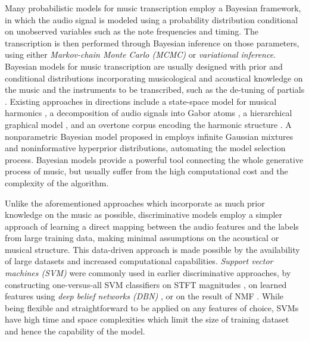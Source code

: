 
Many probabilistic models for music transcription employ a Bayesian framework, in which the audio signal is modeled using a probability distribution conditional on unobserved variables such as the note frequencies and timing.
The transcription is then performed through Bayesian inference on those parameters, using either \textit{Markov-chain Monte Carlo (MCMC)} or \textit{variational inference}.
Bayesian models for music transcription are usually designed with prior and conditional distributions incorporating musicological and acoustical knowledge on the music and the instruments to be transcribed, such as the de-tuning of partials \cite{davy2003harmonic}.
Existing approaches in directions include
a state-space model for musical harmonics \cite{cemgil2003generative},
a decomposition of audio signals into Gabor atoms \cite{davy2006bayesian}, 
a hierarchical graphical model \cite{pesek2017hierarchical},
and an overtone corpus encoding the harmonic structure \cite{sakaue2013overtone}.
A nonparametric Bayesian model proposed in \cite{yoshii2012nonparametric} employs infinite Gaussian mixtures and noninformative hyperprior distributions, automating the model selection process.
Bayesian models provide a powerful tool connecting the whole generative process of music, but usually suffer from the high computational cost and the complexity of the algorithm.



Unlike the aforementioned approaches which incorporate as much prior knowledge on the music as possible, discriminative models employ a simpler approach of learning a direct mapping between the audio features and the labels from large training data, making minimal assumptions on the acoustical or musical structure.
This data-driven approach is made possible by the availability of large datasets and increased computational capabilities.
\textit{Support vector machines (SVM)} were commonly used in earlier discriminative approaches, by constructing one-versus-all SVM classifiers on STFT magnitudes \cite{poliner2006discriminative}, on learned features using \textit{deep belief networks (DBN)} \cite{nam2011classification}, or on the result of NMF \cite{weninger2013nmf}.
While being flexible and straightforward to be applied on any features of choice, SVMs have high time and space complexities which limit the size of training dataset and hence the capability of the model.


